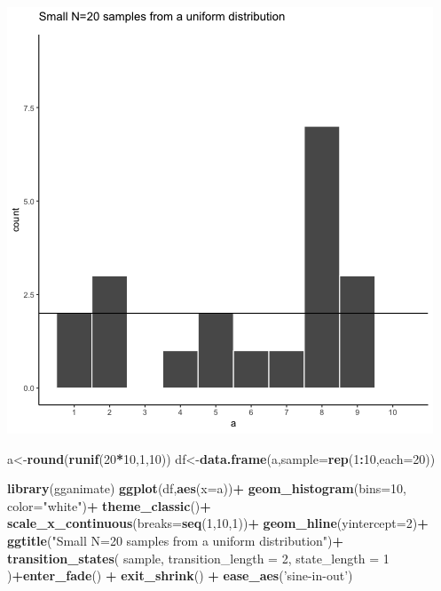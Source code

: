 \documentclass[]{book}
\newenvironment{Shaded}{\begin{snugshade}}{\end{snugshade}}
\newcommand{\DataTypeTok}[1]{\textcolor[rgb]{0.13,0.29,0.53}{#1}}
\newcommand{\DecValTok}[1]{\textcolor[rgb]{0.00,0.00,0.81}{#1}}
\newcommand{\KeywordTok}[1]{\textcolor[rgb]{0.13,0.29,0.53}{\textbf{#1}}}
\newcommand{\NormalTok}[1]{#1}
\newcommand{\OperatorTok}[1]{\textcolor[rgb]{0.81,0.36,0.00}{\textbf{#1}}}
\newcommand{\StringTok}[1]{\textcolor[rgb]{0.31,0.60,0.02}{#1}}
\begin{document}
\includegraphics{gifs/sampleUnifExpected-1.gif}

\begin{Shaded}
\begin{Highlighting}[]
\NormalTok{a<-}\KeywordTok{round}\NormalTok{(}\KeywordTok{runif}\NormalTok{(}\DecValTok{20}\OperatorTok{*}\DecValTok{10}\NormalTok{,}\DecValTok{1}\NormalTok{,}\DecValTok{10}\NormalTok{))}
\NormalTok{df<-}\KeywordTok{data.frame}\NormalTok{(a,}\DataTypeTok{sample=}\KeywordTok{rep}\NormalTok{(}\DecValTok{1}\OperatorTok{:}\DecValTok{10}\NormalTok{,}\DataTypeTok{each=}\DecValTok{20}\NormalTok{))}


\KeywordTok{library}\NormalTok{(gganimate)}
\KeywordTok{ggplot}\NormalTok{(df,}\KeywordTok{aes}\NormalTok{(}\DataTypeTok{x=}\NormalTok{a))}\OperatorTok{+}
\StringTok{  }\KeywordTok{geom_histogram}\NormalTok{(}\DataTypeTok{bins=}\DecValTok{10}\NormalTok{, }\DataTypeTok{color=}\StringTok{"white"}\NormalTok{)}\OperatorTok{+}
\StringTok{  }\KeywordTok{theme_classic}\NormalTok{()}\OperatorTok{+}
\StringTok{  }\KeywordTok{scale_x_continuous}\NormalTok{(}\DataTypeTok{breaks=}\KeywordTok{seq}\NormalTok{(}\DecValTok{1}\NormalTok{,}\DecValTok{10}\NormalTok{,}\DecValTok{1}\NormalTok{))}\OperatorTok{+}
\StringTok{  }\KeywordTok{geom_hline}\NormalTok{(}\DataTypeTok{yintercept=}\DecValTok{2}\NormalTok{)}\OperatorTok{+}
\StringTok{  }\KeywordTok{ggtitle}\NormalTok{(}\StringTok{"Small N=20 samples from a uniform distribution"}\NormalTok{)}\OperatorTok{+}
\StringTok{  }\KeywordTok{transition_states}\NormalTok{(}
\NormalTok{    sample,}
    \DataTypeTok{transition_length =} \DecValTok{2}\NormalTok{,}
    \DataTypeTok{state_length =} \DecValTok{1}
\NormalTok{  )}\OperatorTok{+}\KeywordTok{enter_fade}\NormalTok{() }\OperatorTok{+}\StringTok{ }
\StringTok{  }\KeywordTok{exit_shrink}\NormalTok{() }\OperatorTok{+}
\StringTok{  }\KeywordTok{ease_aes}\NormalTok{(}\StringTok{'sine-in-out'}\NormalTok{)}
\end{Highlighting}
\end{Shaded}
\end{document}
